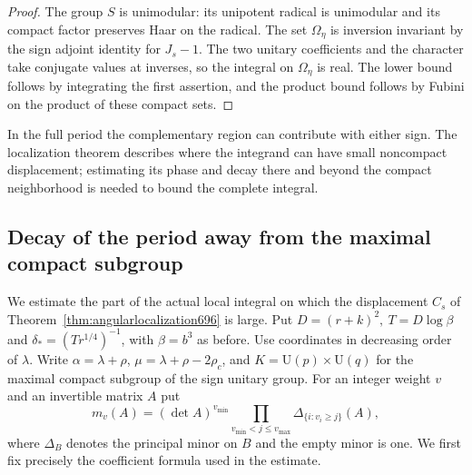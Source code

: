 \documentclass[a4paper,11pt]{article}
\theoremstyle{definition}
\theoremstyle{remark}
\numberwithin{equation}{section}
\begin{document}
\begin{proof}
The group \(S\) is unimodular: its unipotent radical is
unimodular and its compact factor preserves Haar on the
radical. The set \(\Omega_\eta\) is inversion invariant
by the sign adjoint identity for \(J_s-1\).
The two unitary coefficients and the character take
conjugate values at inverses, so the integral on
\(\Omega_\eta\) is real. The lower bound follows by
integrating the first assertion, and the product bound
follows by Fubini on the product of these compact sets.
\end{proof}

In the full period the complementary region can contribute
with either sign. The localization theorem describes where
the integrand can have small noncompact displacement; estimating
its phase and decay there and beyond the compact neighborhood
is needed to bound the complete integral.


\subsection{Decay of the period away from the maximal compact subgroup}
\label{sec:noncompacttail697}

We estimate the part of the actual local integral on which
the displacement \(C_s\) of Theorem~\ref{thm:angularlocalization696}
is large. Put \(D=(r+k)^2,\ T=D\log\beta\) and
\(\delta_*=(Tr^{1/4})^{-1}\), with \(\beta=b^3\) as before.
Use coordinates in decreasing order of \(\lambda\). Write
\(\alpha=\lambda+\rho\), \(\mu=\lambda+\rho-2\rho_c\), and
\(K=\mathrm U(p)\times\mathrm U(q)\) for the maximal compact
subgroup of the sign unitary group. For an integer weight \(v\)
and an invertible matrix \(A\) put
\[
 m_v(A)=(\det A)^{v_{\min}}
    \prod_{v_{\min}<j\le v_{\max}}\Delta_{\{i:v_i\ge j\}}(A),
\]
where \(\Delta_B\) denotes the principal minor on \(B\) and
the empty minor is one. We first fix precisely the coefficient
formula used in the estimate.
\end{document}
